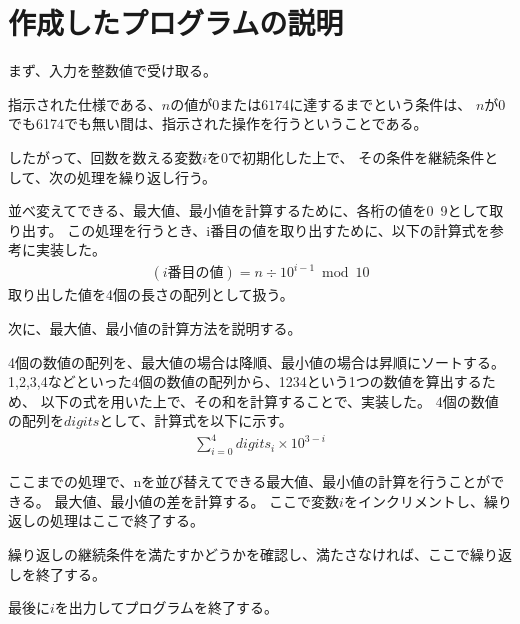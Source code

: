 

\section{作成したプログラムの説明}
まず、入力を整数値で受け取る。

指示された仕様である、$n$の値が$0$または$6174$に達するまでという条件は、
$n$が0でも6174でも無い間は、指示された操作を行うということである。

したがって、回数を数える変数$i$を0で初期化した上で、
その条件を継続条件として、次の処理を繰り返し行う。

並べ変えてできる、最大値、最小値を計算するために、各桁の値を0~9として取り出す。
この処理を行うとき、i番目の値を取り出すために、以下の計算式を参考に実装した。
\begin{align}
    (i番目の値) = n \div 10^{i-1} \bmod 10
\end{align}
取り出した値を4個の長さの配列として扱う。


次に、最大値、最小値の計算方法を説明する。

4個の数値の配列を、最大値の場合は降順、最小値の場合は昇順にソートする。
1,2,3,4などといった4個の数値の配列から、1234という1つの数値を算出するため、
以下の式を用いた上で、その和を計算することで、実装した。
4個の数値の配列を$digits$として、計算式を以下に示す。
\begin{align}
    \sum_{i=0}^4 digits_i \times 10^{3-i}
\end{align}

ここまでの処理で、nを並び替えてできる最大値、最小値の計算を行うことができる。
最大値、最小値の差を計算する。
ここで変数$i$をインクリメントし、繰り返しの処理はここで終了する。

繰り返しの継続条件を満たすかどうかを確認し、満たさなければ、ここで繰り返しを終了する。

最後に$i$を出力してプログラムを終了する。


